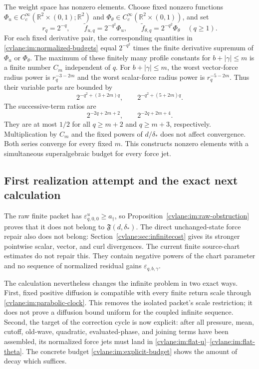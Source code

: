 The weight space has nonzero elements.  Choose fixed nonzero functions
$\Phi_u\in C_c^\infty(\mathbb R^2\times(0,1);\mathbb R^2)$ and
$\Phi_\theta\in C_c^\infty(\mathbb R^2\times(0,1))$, and set
\begin{equation}\label{cvlane:im:explicit-budget}
 r_q=2^{-q},\qquad
 \widetilde f_{u,q}=2^{-q^2}\Phi_u,\qquad
 \widetilde f_{\theta,q}=2^{-q^2}\Phi_\theta
 \quad(q\geq1).
\end{equation}
For each fixed derivative pair, the corresponding quantities in
\eqref{cvlane:im:normalized-budgets} equal $2^{-q^2}$ times the finite
derivative supremum of $\Phi_u$ or $\Phi_\theta$.  The maximum of these
finitely many profile constants for $b+|\gamma|\leq m$ is a finite
number $C_m$ independent of $q$.
For $b+|\gamma|\leq m$, the worst vector-force radius power is
$r_q^{-3-2m}$ and the worst scalar-force radius power is
$r_q^{-5-2m}$.  Thus their variable parts are bounded by
\[
 2^{-q^2+(3+2m)q},\qquad
 2^{-q^2+(5+2m)q}.
\]
The successive-term ratios are
\[
 2^{-2q+2m+2},\qquad 2^{-2q+2m+4}.
\]
They are at most $1/2$ for all $q\geq m+2$ and $q\geq m+3$,
respectively.  Multiplication by $C_m$ and the fixed powers of
$d/\delta_*$ does not affect convergence.  Both series converge for
every fixed $m$.  This constructs nonzero elements with a simultaneous
superalgebraic budget for every force jet.

\subsection{First realization attempt and the exact next calculation}

The raw finite packet has
$\varepsilon^u_{q,0,0}\geq a_\dagger$, so
Proposition~\ref{cvlane:im:raw-obstruction} proves that it does not belong to
$\mathfrak F(d,\delta_*)$.  The direct unchanged-state force repair also
does not belong: Section~\ref{cvlane:sec:infinitecost} gives its stronger
pointwise scalar, vector, and curl divergences.  The current finite
source-chart estimates do not repair this.  They contain negative powers
of the chart parameter and no sequence of normalized residual gains
$\varepsilon_{q,b,\gamma}$.

The calculation nevertheless changes the infinite problem in two exact
ways.  First, fixed positive diffusion is compatible with every finite
return scale through \eqref{cvlane:im:parabolic-clock}.  This removes the
isolated packet's scale restriction; it does not prove a diffusion
bound uniform for the coupled infinite sequence.  Second, the target of
the correction cycle is now explicit:
after all pressure, mean, cutoff, old-wave, quadratic, evaluated-phase,
and joining terms have been assembled, its normalized force jets must
land in \eqref{cvlane:im:flat-u}--\eqref{cvlane:im:flat-theta}.  The concrete budget
\eqref{cvlane:im:explicit-budget} shows the amount of decay which suffices.

